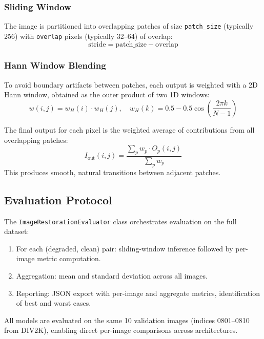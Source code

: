 \subsubsection{Sliding Window}
The image is partitioned into overlapping patches of size \texttt{patch\_size} (typically 256) with \texttt{overlap} pixels (typically 32--64) of overlap:
\begin{equation}
\text{stride} = \text{patch\_size} - \text{overlap}
\end{equation}

\subsubsection{Hann Window Blending}
To avoid boundary artifacts between patches, each output is weighted with a 2D Hann window, obtained as the outer product of two 1D windows:
\begin{equation}
w(i, j) = w_H(i) \cdot w_H(j), \quad w_H(k) = 0.5 - 0.5 \cos\!\left(\frac{2\pi k}{N - 1}\right)
\end{equation}

The final output for each pixel is the weighted average of contributions from all overlapping patches:
\begin{equation}
I_{\text{out}}(i, j) = \frac{\sum_p w_p \cdot O_p(i, j)}{\sum_p w_p}
\end{equation}
This produces smooth, natural transitions between adjacent patches.

\subsection{Evaluation Protocol}

The \texttt{ImageRestorationEvaluator} class orchestrates evaluation on the full dataset:
\begin{enumerate}
    \item For each (degraded, clean) pair: sliding-window inference followed by per-image metric computation.
    \item Aggregation: mean and standard deviation across all images.
    \item Reporting: JSON export with per-image and aggregate metrics, identification of best and worst cases.
\end{enumerate}

All models are evaluated on the same 10 validation images (indices 0801--0810 from DIV2K), enabling direct per-image comparisons across architectures.

